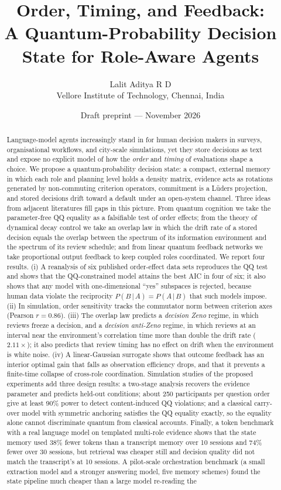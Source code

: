 \documentclass[11pt]{article}
\title{\textbf{Order, Timing, and Feedback:\\ A Quantum-Probability Decision State for Role-Aware Agents}}
\author{%
Lalit Aditya R D\\[4pt]
\small Vellore Institute of Technology, Chennai, India
}
\date{\small Draft preprint --- November 2026}
\theoremstyle{definition}
\theoremstyle{remark}
\begin{document}
\maketitle

\begin{abstract}
Language-model agents increasingly stand in for human decision makers in surveys, organisational workflows, and city-scale simulations, yet they store decisions as text and expose no explicit model of how the \emph{order} and \emph{timing} of evaluations shape a choice. We propose a quantum-probability decision state: a compact, external memory in which each role and planning level holds a density matrix, evidence acts as rotations generated by non-commuting criterion operators, commitment is a L\"uders projection, and stored decisions drift toward a default under an open-system channel. Three ideas from adjacent literatures fill gaps in this picture. From quantum cognition we take the parameter-free QQ equality as a falsifiable test of order effects; from the theory of dynamical decay control we take an overlap law in which the drift rate of a stored decision equals the overlap between the spectrum of its information environment and the spectrum of its review schedule; and from linear quantum feedback networks we take proportional output feedback to keep coupled roles coordinated. We report four results. (i) A reanalysis of six published order-effect data sets reproduces the QQ test and shows that the QQ-constrained model attains the best AIC in four of six; it also shows that any model with one-dimensional ``yes'' subspaces is rejected, because human data violate the reciprocity $P(B\,|\,A)=P(A\,|\,B)$ that such models impose. (ii) In simulation, order sensitivity tracks the commutator norm between criterion axes (Pearson $r=0.86$). (iii) The overlap law predicts a \emph{decision Zeno} regime, in which reviews freeze a decision, and a \emph{decision anti-Zeno} regime, in which reviews at an interval near the environment's correlation time more than double the drift rate ($2.11\times$); it also predicts that review timing has no effect on drift when the environment is white noise. (iv) A linear-Gaussian surrogate shows that outcome feedback has an interior optimal gain that falls as observation efficiency drops, and that it prevents a finite-time collapse of cross-role coordination. Simulation studies of the proposed experiments add three design results: a two-stage analysis recovers the evidence parameter and predicts held-out conditions; about 250 participants per question order give at least 90\% power to detect content-induced QQ violations; and a classical carry-over model with symmetric anchoring satisfies the QQ equality exactly, so the equality alone cannot discriminate quantum from classical accounts. Finally, a token benchmark with a real language model on templated multi-role evidence shows that the state memory used 38\% fewer tokens than a transcript memory over 10 sessions and 74\% fewer over 30 sessions, but retrieval was cheaper still and decision quality did not match the transcript's at 10 sessions. A pilot-scale orchestration benchmark (a small extraction model and a stronger answering model, five memory schemes) found the state pipeline much cheaper than a large model re-reading the 
\end{abstract}
\end{document}
